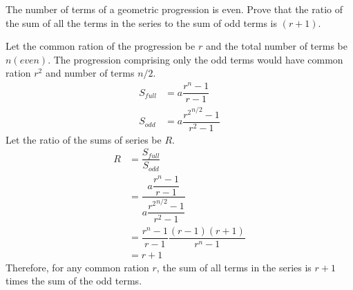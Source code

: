 
%
%
%
%
% 
% 

\question The number of terms of a geometric progression is even. Prove that the ratio of the sum of all the terms in the series to the sum of odd terms is $(r+1)$.

\insertQR{}

\ifprintanswers
\fi 

\begin{solution}
  Let the common ration of the progression be $r$ and the total number of terms be $n(even)$. The progression comprising only the odd terms would have common ration $r^2$ and number of terms $n/2$. \\
  \begin{align}
    S_{full} &= a\dfrac{r^n-1}{r-1} \\
    S_{odd}  &= a\dfrac{{r^2}^{n/2}-1}{r^2-1}
  \end{align}
  Let the ratio of the sums of series be $R$.
  \begin{align}
    R &= \dfrac{S_{full}}{S_{odd}} \\
      &= \dfrac{a\dfrac{r^n-1}{r-1}}{a\dfrac{{r^2}^{n/2}-1}{r^2-1}} \\
      &= \dfrac{r^n-1}{r-1}\dfrac{(r-1)(r+1)}{r^n-1} \\
      &= r + 1
  \end{align}
  Therefore, for any common ration $r$, the sum of all terms in the series is $r+1$ times the sum of the odd terms.
\end{solution}
